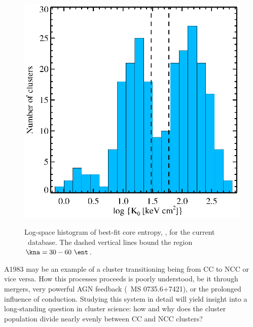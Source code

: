 \documentclass[letterpaper,11pt,twocolumn]{article}
\begin{document}
\\
\begin{figure}[ht]
  \begin{center}
    \includegraphics*[width=\columnwidth, trim=33mm 8mm 42mm 18mm, clip]{k0hist}
    \caption{Log-space histogram of best-fit core entropy, \kna, for the
      current \accept\ database. The dashed vertical lines bound the
      region $\kna = 30-60~\ent$.}
    \vspace{-24pt}
    \label{fig:hist}
  \end{center}
\end{figure}
A1983 may be an example of a cluster transitioning being from CC to
NCC or vice versa. How this processes proceeds is poorly understood,
be it through mergers, very powerful AGN feedback (\eg\ MS
0735.6+7421), or the prolonged influence of conduction. Studying this
system in detail will yield insight into a long-standing question in
cluster science: how and why does the cluster population divide nearly
evenly between CC and NCC clusters?
\end{document}
